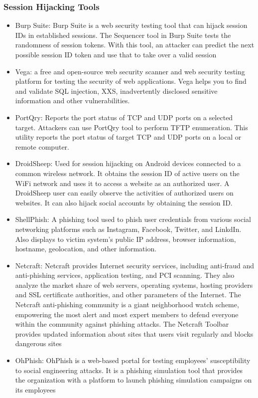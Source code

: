 \subsubsection{Session Hijacking Tools}
\begin{itemize}
    \item  Burp Suite: Burp Suite is a web security testing tool that can hijack session IDs in established sessions. The Sequencer tool in Burp Suite tests the randomness of session tokens. With this tool, an attacker can predict the next possible session ID token and use that to take over a valid session
    \item Vega: a free and open-source web security scanner and web security testing platform for testing the security of web applications. Vega helps you to find and validate SQL injection, XXS, inadvertently disclosed sensitive information and other vulnerabilities.
    \item PortQry: Reports the port status of TCP and UDP ports on a selected target. Attackers can use PortQry tool to perform TFTP enumeration. This utility reports the port status of target TCP and UDP ports on a local or remote computer.
    \item DroidSheep: Used for session hijacking on Android devices connected to a common wireless network. It obtains the session ID of active users on the WiFi network and uses it to access a website as an authorized user. A DroidSheep user can easily observe the activities of authorized users on websites. It can also hijack social accounts by obtaining the session ID.
    \item ShellPhish: A phishing tool used to phish user credentials from various social networking platforms such as Instagram, Facebook, Twitter, and LinkdIn. Also displays to victim system's public IP address, browser information, hostname, geolocation, and other information.
    \item Netcraft: Netcraft provides Internet security services, including anti-fraud and anti-phishing services, application testing, and PCI scanning. They also analyze the market share of web servers, operating systems, hosting providers and SSL certificate authorities, and other parameters of the Internet. The Netcraft anti-phishing community is a giant neighborhood watch scheme, empowering the most alert and most expert members to defend everyone within the community against phishing attacks. The Netcraft Toolbar provides updated information about sites that users visit regularly and blocks dangerous sites
    \item OhPhish: OhPhish is a web-based portal for testing employees' susceptibility to social engineering attacks. It is a phishing simulation tool that provides the organization with a platform to launch phishing simulation campaigns on its employees

\end{itemize}
